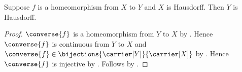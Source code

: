 \begin{theorem}\label{homeomorphism_preserves_hausdorff}
    Suppose $f$ is a homeomorphism from $X$ to $Y$ and $X$ is Hausdorff.
    Then $Y$ is Hausdorff.
\end{theorem}
\begin{proof}
    $\converse{f}$ is a homeomorphism from $Y$ to $X$ by .
    Hence $\converse{f}$ is continuous from $Y$ to $X$ and
        $\converse{f}\in\bijections{\carrier[Y]}{\carrier[X]}$ by .
    Hence $\converse{f}$ is injective by .
    Follows by .
\end{proof}
